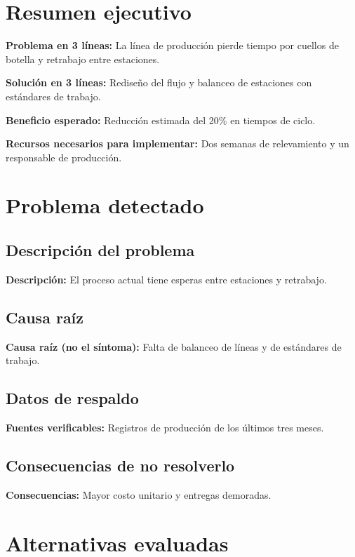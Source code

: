\documentclass[11pt,a4paper]{article}
\newcommand{\campo}[2]{\textbf{\textcolor{irdblack}{#1:}} \textcolor{irdblack}{#2}\par\vspace{0.3em}}
\begin{document}
\section{Resumen ejecutivo}

\begin{infobox}
\campo{Problema en 3 líneas}{La línea de producción pierde tiempo por cuellos de botella y retrabajo entre estaciones.}
\campo{Solución en 3 líneas}{Rediseño del flujo y balanceo de estaciones con estándares de trabajo.}
\campo{Beneficio esperado}{Reducción estimada del 20\% en tiempos de ciclo.}
\campo{Recursos necesarios para implementar}{Dos semanas de relevamiento y un responsable de producción.}
\end{infobox}

\section{Problema detectado}

\subsection{Descripción del problema}
\campo{Descripción}{El proceso actual tiene esperas entre estaciones y retrabajo.}

\subsection{Causa raíz}
\campo{Causa raíz (no el síntoma)}{Falta de balanceo de líneas y de estándares de trabajo.}

\subsection{Datos de respaldo}
\campo{Fuentes verificables}{Registros de producción de los últimos tres meses.}

\subsection{Consecuencias de no resolverlo}
\campo{Consecuencias}{Mayor costo unitario y entregas demoradas.}

\section{Alternativas evaluadas}
\end{document}

